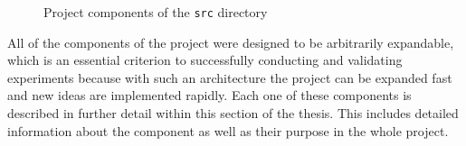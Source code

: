\begin{figure}[ht]
\caption{Project components of the \texttt{src} directory}
\label{fig:Project-Components}
\end{figure}
\noindent
All of the components of the project were designed to be arbitrarily expandable, which is an essential criterion to successfully conducting and validating experiments because with such an architecture the project can be expanded fast and new ideas are implemented rapidly.
\newline
\newline
Each one of these components is described in further detail within this section of the thesis. This includes detailed information about the component as well as their purpose in the whole project.

